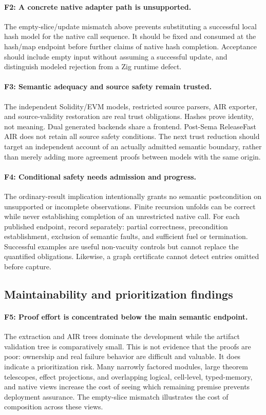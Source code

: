 \documentclass[conference]{IEEEtran}
\begin{document}
\paragraph{F2: A concrete native adapter path is unsupported.}
The empty-slice/update mismatch above prevents substituting a successful local
hash model for the native call sequence. It should be fixed and consumed at
the hash/map endpoint before further claims of native hash completion.
Acceptance should include empty input without assuming a successful update,
and distinguish modeled rejection from a Zig runtime defect.

\paragraph{F3: Semantic adequacy and source safety remain trusted.}
The independent Solidity/EVM models, restricted source parsers, AIR exporter,
and source-validity restoration are real trust obligations. Hashes prove
identity, not meaning. Dual generated backends share a frontend. Post-Sema
ReleaseFast AIR does not retain all source safety conditions. The next trust
reduction should target an independent account of an actually admitted
semantic boundary, rather than merely adding more agreement proofs between
models with the same origin.

\paragraph{F4: Conditional safety needs admission and progress.}
The ordinary-result implication intentionally grants no semantic postcondition
on unsupported or incomplete observations. Finite recursion unfolds can be
correct while never establishing completion of an unrestricted native call.
For each published endpoint, record separately: partial correctness,
precondition establishment, exclusion of semantic faults, and sufficient fuel
or termination. Successful examples are useful non-vacuity controls but cannot
replace the quantified obligations. Likewise, a graph certificate cannot
detect entries omitted before capture.

\subsection{Maintainability and prioritization findings}
\paragraph{F5: Proof effort is concentrated below the main semantic endpoint.}
The extraction and AIR trees dominate the development while the artifact
validation tree is comparatively small. This is not evidence that the proofs
are poor: ownership and real failure behavior are difficult and valuable.
It does indicate a prioritization risk. Many narrowly factored modules,
large theorem telescopes, effect projections, and overlapping logical,
cell-level, typed-memory, and native views increase the cost of seeing which
remaining premise prevents deployment assurance. The empty-slice mismatch
illustrates the cost of composition across these views.
\end{document}
